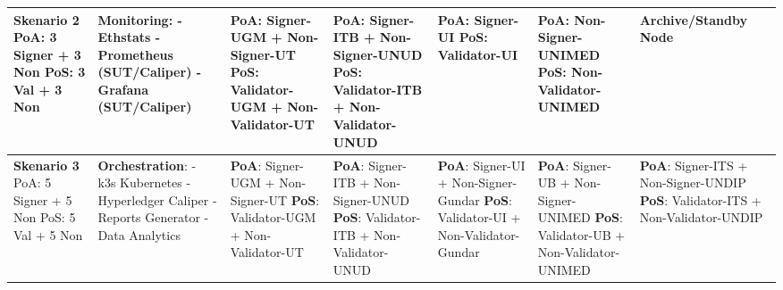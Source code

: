 \begin{landscape}
{\begin{longtable}{|p{2.5cm}|p{3cm}|p{3cm}|p{3cm}|p{3cm}|p{3cm}|p{3cm}|}
\textbf{Skenario 2} \newline
PoA: 3 Signer + 3 Non \newline
PoS: 3 Val + 3 Non
& 
\textbf{Monitoring}: \newline
- Ethstats \newline
- Prometheus (SUT/Caliper) \newline
- Grafana (SUT/Caliper)
& 
\textbf{PoA}: Signer-UGM + \newline Non-Signer-UT \newline
\textbf{PoS}: Validator-UGM + \newline Non-Validator-UT
& 
\textbf{PoA}: Signer-ITB + \newline Non-Signer-UNUD \newline
\textbf{PoS}: Validator-ITB + \newline Non-Validator-UNUD
& 
\textbf{PoA}: Signer-UI \newline
\textbf{PoS}: Validator-UI
& 
\textbf{PoA}: Non-Signer-UNIMED \newline
\textbf{PoS}: Non-Validator-UNIMED
& 
Archive/Standby Node
\\ \hline

\textbf{Skenario 3} \newline
PoA: 5 Signer + 5 Non \newline
PoS: 5 Val + 5 Non
& 
\textbf{Orchestration}: \newline
- k3s Kubernetes \newline
- Hyperledger Caliper \newline
- Reports Generator \newline
- Data Analytics
& 
\textbf{PoA}: Signer-UGM + \newline Non-Signer-UT \newline
\textbf{PoS}: Validator-UGM + \newline Non-Validator-UT
& 
\textbf{PoA}: Signer-ITB + \newline Non-Signer-UNUD \newline
\textbf{PoS}: Validator-ITB + \newline Non-Validator-UNUD
& 
\textbf{PoA}: Signer-UI + \newline Non-Signer-Gundar \newline
\textbf{PoS}: Validator-UI + \newline Non-Validator-Gundar
& 
\textbf{PoA}: Signer-UB + \newline Non-Signer-UNIMED \newline
\textbf{PoS}: Validator-UB + \newline Non-Validator-UNIMED
& 
\textbf{PoA}: Signer-ITS + \newline Non-Signer-UNDIP \newline
\textbf{PoS}: Validator-ITS + \newline Non-Validator-UNDIP
\\ \hline

\end{longtable}
}
\end{landscape}

